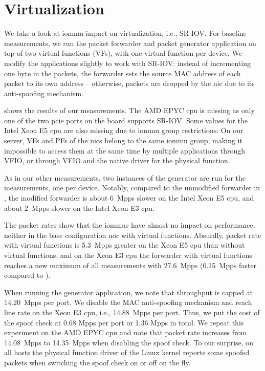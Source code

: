 \section{Virtualization}
\label{sec:virtualization}

We take a look at \ac{iommu} impact on virtualization, i.e., SR-IOV. For
baseline measurements, we run the packet forwarder and packet generator
application on top of two virtual functions (VFs), with one virtual function per
device. We modify the applications slightly to work with SR-IOV: instead of
incrementing one byte in the packets, the forwarder sets the source MAC address
of each packet to its own address -- otherwise, packets are dropped by the
\ac{nic} due to its anti-spoofing mechanism.

 shows the results of our measurements. The AMD EPYC
\ac{cpu} is missing as only one of the two \ac{pcie} ports on the board supports
SR-IOV. Some values for the Intel Xeon E5 \ac{cpu} are also missing due to
\ac{iommu} group restrictions: On our server, VFs and PFs of the \acp{nic}
belong to the same \ac{iommu} group, making it impossible to access them at the
same time by multiple applications through VFIO, or through VFIO and the native
driver for the physical function.

As in our other measurements, two instances of the generator are run for the
measurements, one per device. Notably, compared to the unmodified forwarder in
, the modified forwarder is about 6~Mpps
slower on the Intel Xeon E5 \ac{cpu}, and about 2~Mpps slower on the Intel Xeon
E3 \ac{cpu}.

The packet rates show that the \acp{iommu} have almost no impact on performance,
neither in the base configuration nor with virtual functions. Absurdly, packet
rate with virtual functions is 5.3~Mpps greater on the Xeon E5 \ac{cpu} than
without virtual functions, and on the Xeon E3 \ac{cpu} the forwarder with
virtual functions reaches a new maximum of all measurements with 27.6~Mpps
(0.15~Mpps faster compared to ).

When running the generator application, we note that throughput is capped at
14.20~Mpps per port. We disable the MAC anti-spoofing mechanism and reach line
rate on the Xeon E3 \ac{cpu}, i.e., 14.88~Mpps per port. Thus, we put the cost
of the spoof check at 0.68 Mpps per port or 1.36 Mpps in total. We repeat this
experiment on the AMD EPYC \ac{cpu} and note that packet rate increases from
14.08~Mpps to 14.35~Mpps when disabling the spoof check. To our surprise, on all
hosts the physical function driver of the Linux kernel reports some spoofed
packets when switching the spoof check on or off on the fly.

